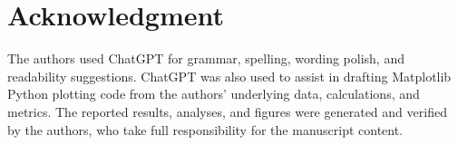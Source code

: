 \documentclass[conference]{IEEEtran}
\begin{document}
\section*{Acknowledgment}
The authors used ChatGPT for grammar, spelling, wording polish, and readability suggestions. ChatGPT was also used to assist in drafting Matplotlib Python plotting code from the authors' underlying data, calculations, and metrics. The reported results, analyses, and figures were generated and verified by the authors, who take full responsibility for the manuscript content.



\end{document}
